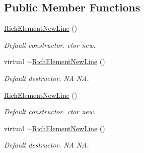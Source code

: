 \subsection*{Public Member Functions}
\begin{DoxyCompactItemize}
\item 
\mbox{\label{classui_1_1RichElementNewLine_a68cf0baba19dac904cd981d50422eaf3}} 
\hyperlink{classui_1_1RichElementNewLine_a68cf0baba19dac904cd981d50422eaf3}{Rich\+Element\+New\+Line} ()
\begin{DoxyCompactList}\small\item\em Default constructor.  ctor  new. \end{DoxyCompactList}\item 
\mbox{\label{classui_1_1RichElementNewLine_a90a6ab318312fcb512d305fce1200cb7}} 
virtual \hyperlink{classui_1_1RichElementNewLine_a90a6ab318312fcb512d305fce1200cb7}{$\sim$\+Rich\+Element\+New\+Line} ()
\begin{DoxyCompactList}\small\item\em Default destructor.  NA  NA. \end{DoxyCompactList}\item 
\mbox{\label{classui_1_1RichElementNewLine_a68cf0baba19dac904cd981d50422eaf3}} 
\hyperlink{classui_1_1RichElementNewLine_a68cf0baba19dac904cd981d50422eaf3}{Rich\+Element\+New\+Line} ()
\begin{DoxyCompactList}\small\item\em Default constructor.  ctor  new. \end{DoxyCompactList}\item 
\mbox{\label{classui_1_1RichElementNewLine_a90a6ab318312fcb512d305fce1200cb7}} 
virtual \hyperlink{classui_1_1RichElementNewLine_a90a6ab318312fcb512d305fce1200cb7}{$\sim$\+Rich\+Element\+New\+Line} ()
\begin{DoxyCompactList}\small\item\em Default destructor.  NA  NA. \end{DoxyCompactList}\end{DoxyCompactItemize}
